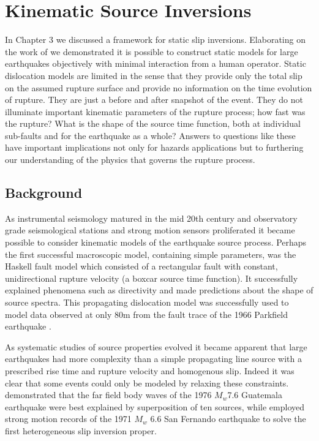 
\chapter{Kinematic Source Inversions}

In Chapter 3 we discussed a framework for static slip inversions. Elaborating on the work of \citet{Crowell2012} we demonstrated it is possible to construct static models for large earthquakes objectively with minimal interaction from a human operator. Static dislocation models are limited in the sense that they provide only the total slip on the assumed rupture surface and provide no information on the time evolution of rupture. They are just a before and after snapshot of the event.  They do not illuminate important kinematic parameters of the rupture process; how fast was the rupture? What is the shape of the source time function, both at individual sub-faults and for the earthquake as a whole? Answers to questions like these have important implications not only for hazards applications but to furthering our understanding of the physics that governs the rupture process.

\section{Background}

\label{sec_backgr}

As instrumental seismology matured in the mid 20th century and observatory grade seismological stations and strong motion sensors proliferated it became possible to consider kinematic models of the earthquake source process. Perhaps the first successful macroscopic model, containing simple parameters, was the Haskell fault model \citep{haskell1964,haskell1969} which consisted of a rectangular fault with constant, unidirectional rupture velocity (a boxcar source time function). It successfully explained phenomena such as directivity and made predictions about the shape of source spectra. This propagating dislocation model was successfully used to model data observed at only 80m from the fault trace of the 1966 Parkfield earthquake \citep{aki1968}.

As systematic studies of source properties evolved it became apparent that large earthquakes had more complexity than a simple propagating line source with a prescribed rise time and rupture velocity and homogenous slip. Indeed it was clear that some events could only be modeled by relaxing these constraints. \citet{kanamori1978} demonstrated that the far field body waves of the 1976 $M_w$7.6 Guatemala earthquake were best explained by superposition of ten sources, while \citet{trifunac1974} employed strong motion records of the 1971 $M_w$ 6.6 San Fernando earthquake to solve the first heterogeneous slip inversion proper.

